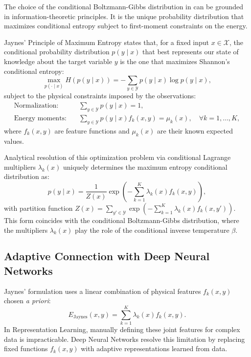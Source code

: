 \documentclass[11pt, oneside, openany]{book}
\begin{document}
The choice of the conditional Boltzmann-Gibbs distribution in  can be grounded in information-theoretic principles. It is the unique probability distribution that maximizes conditional entropy subject to first-moment constraints on the energy.

Jaynes' Principle of Maximum Entropy \cite{jaynes1957information} states that, for a fixed input $x \in \mathcal{X}$, the conditional probability distribution $p(y \mid x)$ that best represents our state of knowledge about the target variable $y$ is the one that maximizes Shannon's conditional entropy:
\begin{equation}
\label{eq:2.5}
\max_{p(\cdot \mid x)} H(p(y \mid x)) = -\sum_{y \in \mathcal{Y}} p(y \mid x) \log p(y \mid x),
\end{equation}
subject to the physical constraints imposed by the observations:
\begin{align}
\text{Normalization:} \quad & \sum_{y \in \mathcal{Y}} p(y \mid x) = 1, \label{eq:2.6} \\
\text{Energy moments:} \quad & \sum_{y \in \mathcal{Y}} p(y \mid x) f_{k}(x,y) = \mu_{k}(x), \quad \forall k = 1, \dots, K, \label{eq:2.7}
\end{align}
where $f_{k}(x,y)$ are feature functions and $\mu_{k}(x)$ are their known expected values.

Analytical resolution of this optimization problem via conditional Lagrange multipliers $\lambda_{k}(x)$ uniquely determines the maximum entropy conditional distribution as:
\begin{equation}
\label{eq:2.8}
p(y \mid x) = \frac{1}{Z(x)} \exp\left(-\sum_{k=1}^{K} \lambda_{k}(x) f_{k}(x,y)\right),
\end{equation}
with partition function $Z(x) = \sum_{y' \in \mathcal{Y}} \exp\left(-\sum_{k=1}^{K} \lambda_{k}(x) f_{k}(x,y')\right)$. This form coincides with the conditional Boltzmann-Gibbs distribution, where the multipliers $\lambda_{k}(x)$ play the role of the conditional inverse temperature $\beta$.

\subsection{Adaptive Connection with Deep Neural Networks}
\label{sec:2.3.1}

Jaynes' formulation uses a linear combination of physical features $f_{k}(x,y)$ chosen \textit{a priori}:
\begin{equation}
\label{eq:2.9}
E_{\text{Jaynes}}(x,y) = \sum_{k=1}^{K} \lambda_{k}(x) f_{k}(x,y).
\end{equation}
In Representation Learning, manually defining these joint features for complex data is impracticable. Deep Neural Networks resolve this limitation by replacing fixed functions $f_{k}(x,y)$ with adaptive representations learned from data.
\end{document}
